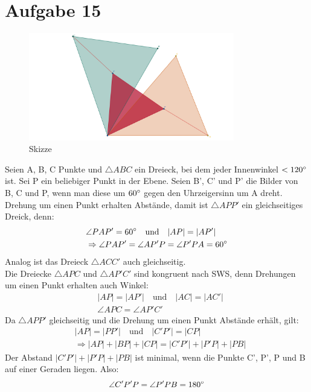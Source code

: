 \documentclass[12pt,a4paper]{article}
\begin{document}
\newpage
\section*{Aufgabe 15}
\begin{figure}[htbp]
    \centering        
    \includegraphics[width=0.8\textwidth]{Blatt05_Aufgabe_15.png}
    \caption{Skizze}
    \label{fig:mein_bild}
\end{figure}
\noindent Seien A, B, C Punkte und $\triangle ABC$ ein Dreieck, bei dem jeder Innenwinkel $< 120\degree$ ist. Sei P ein beliebiger Punkt in der Ebene. Seien B', C' und P' die Bilder von B, C und P, wenn man diese um $60\degree$ gegen den Uhrzeigersinn um A dreht.
Drehung um einen Punkt erhalten Abstände, damit ist $\triangle APP'$ ein gleichseitiges Dreick, denn:
\begin{align*}
    & \angle PAP' = 60\degree \quad \text{und} \quad |AP| = |AP'| \\
    & \Rightarrow \angle PAP' = \angle AP'P = \angle P'PA = 60\degree
\end{align*}
Analog ist das Dreieck $\triangle ACC'$ auch gleichseitig.\\
Die Dreiecke $\triangle APC$ und $\triangle AP'C'$ sind kongruent nach SWS, denn Drehungen um einen Punkt erhalten auch Winkel:
\begin{align}
    & |AP| = |AP'| \quad \text{und} \quad |AC| = |AC'| \\
    & \angle APC = \angle AP'C'
\end{align}
Da $\triangle APP'$ gleichseitig und die Drehung um einen Punkt Abstände erhält, gilt:
\begin{align*}
    & |AP| = |PP'| \quad \text{und} \quad |C'P'| = |CP| \\
    & \Rightarrow |AP| + |BP| + |CP| = |C'P'| + |P'P| + |PB|
\end{align*}
Der Abstand $|C'P'| + |P'P| + |PB|$ ist minimal, wenn die Punkte C', P', P und B auf einer Geraden liegen. Also:
\[
    \angle C'P'P = \angle P'PB = 180\degree
\]
\end{document}
